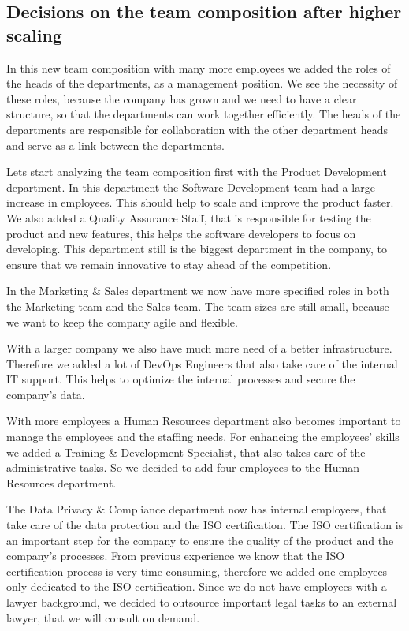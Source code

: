 \subsection{Decisions on the team composition after higher scaling}
\label{sub:decision_on_team_comp_highscaled}

In this new team composition with many more employees we added the roles of the heads of the departments, as a management position.
We see the necessity of these roles, because the company has grown and we need to have a clear structure, so that the departments can work together efficiently.
The heads of the departments are responsible for collaboration with the other department heads and serve as a link between the departments.

\p
Lets start analyzing the team composition first with the Product Development department.
In this department the Software Development team had a large increase in employees.
This should help to scale and improve the product faster.
We also added a Quality Assurance Staff, that is responsible for testing the product and new features, this helps the software developers to focus on developing.
This department still is the biggest department in the company, to ensure that we remain innovative to stay ahead of the competition.

\p
In the Marketing \& Sales department we now have more specified roles in both the Marketing team and the Sales team.
The team sizes are still small, because we want to keep the company agile and flexible.

\p
With a larger company we also have much more need of a better infrastructure.
Therefore we added a lot of DevOps Engineers that also take care of the internal IT support.
This helps to optimize the internal processes and secure the company's data.

\p
With more employees a Human Resources department also becomes important to manage the employees and the staffing needs.
For enhancing the employees' skills we added a Training \& Development Specialist, that also takes care of the administrative tasks.
So we decided to add four employees to the Human Resources department.

\p
The Data Privacy \& Compliance department now has internal employees, that take care of the data protection and the ISO certification.
The ISO certification is an important step for the company to ensure the quality of the product and the company's processes.
From previous experience we know that the ISO certification process is very time consuming, therefore we added one employees only dedicated to the ISO certification.
Since we do not have employees with a lawyer background, we decided to outsource important legal tasks to an external lawyer, that we will consult on demand.

